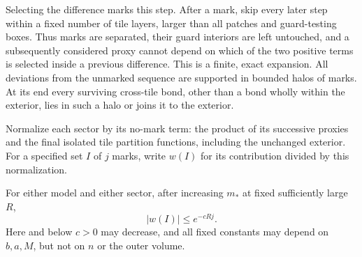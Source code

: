 Selecting the difference marks this step. After a mark, skip every
later step within a fixed number of tile layers, larger than all
patches and guard-testing boxes. Thus marks are separated, their
guard interiors are left untouched, and a subsequently considered
proxy cannot depend on which of the two positive terms is selected
inside a previous difference. This is a finite, exact expansion.
All deviations from the unmarked sequence are supported in bounded
halos of marks. At its end every surviving cross-tile bond, other
than a bond wholly within the exterior, lies in such a halo or
joins it to the exterior.

Normalize each sector by its no-mark term: the product of its
successive proxies and the final isolated tile partition functions,
including the unchanged exterior. For a specified set \(I\) of
\(j\) marks, write \(w(I)\) for its contribution divided by this
normalization.

\begin{lemma}\label{lem:magnetic-pattern}
For either model and either sector, after increasing \(m_*\) at
fixed sufficiently large \(R\),
\begin{equation}\label{eq:magnetic-pattern}
                         |w(I)|\le e^{-cRj}.
\end{equation}
Here and below \(c>0\) may decrease, and all fixed constants may
depend on \(b,a,M\), but not on \(n\) or the outer volume.
\end{lemma}

